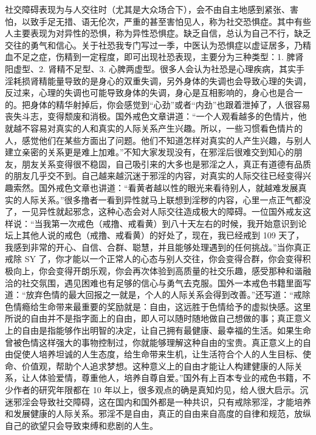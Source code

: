 社交障碍表现为与人交往时（尤其是大众场合下），会不由自主地感到紧张、害怕，以致手足无措、语无伦次，严重的甚至害怕见人，称为社交恐惧症。其中有些人主要表现为对异性的恐惧，称为异性恐惧症。缺乏自信，总认为自己不行，缺乏交往的勇气和信心。关于社恐我专门写过一季，中医认为恐惧症以虚证居多，乃精血不足之症，伤精到一定程度，即可出现社恐表现，主要分为三种类型：1. 脾肾阳虚型、2. 肾精不足型、3. 心脾两虚型。很多人会认为社恐是心理疾病，其实手淫耗损肾精能量导致的是身心的双重失调，另外身体的失调也会导致心理的失调，反过来，心理的失调也可能导致身体的失调，身心是互相影响的，身心也是合一的。把身体的精华射掉后，你会感觉到“心劲”或者“内劲”也跟着泄掉了，人很容易丧失斗志，变得颓废和消极。国外戒色文章讲道：“一个人观看越多的色情片，他就越不容易对真实的人和真实的人际关系产生兴趣。所以，一些习惯看色情片的人，感觉他们在某些方面出了问题。他们不知道怎样对真实的人产生兴趣，与别人建立亲密的关系更是难上加难。”不知大家发现没有，在邪淫后很难交到知心的朋友，朋友关系变得很不稳固，自己吸引来的大多也是邪淫之人，真正有道德有品质的朋友几乎交不到。自己越来越沉迷于邪淫的内容，对真实的人际交往已经变得兴趣索然。国外戒色文章也讲道：“看黄者越以性的眼光来看待别人，就越难发展真实的人际关系。”很多撸者一看到异性就马上联想到淫秽的内容，心里一点正气都没了，一见异性就起邪念，这种心态会对人际交往造成极大的障碍。一位国外戒友这样说：“当我第一次戒色（戒撸、戒看黄）到八十天左右的时候，我开始意识到论坛上其他人说的戒色（戒撸、戒看黄）的好处了，现在，我已经戒到 109 天了，我感到非常的开心、自信、合群、聪慧，并且能够处理遇到的任何挑战。”当你真正戒除 SY 了，你才能以一个正常人的心态与别人交往，你会变得合群，你会变得积极向上，你会变得开朗乐观，你会再次体验到高质量的社交乐趣，感受那种和谐融洽的社交氛围，遇见困难也有足够的信心与勇气去克服。国外一本戒色书籍里面写道：“放弃色情的最大回报之一就是，个人的人际关系会得到改善。”还写道：“戒除色情瘾给生命带来最重要的奖励就是：自由，这远胜于色情给予的虚拟快感。这里所说的自由并不是指字面上的自由，即人可以随时随地做自己想做的事；真正意义上的自由是指能够作出明智的决定，让自己拥有最健康、最幸福的生活。如果生命曾被色情这样强大的事物控制过，你就能够理解这种自由的宝贵。真正意义上的自由促使人培养坦诚的人生态度，给生命带来生机，让生活符合个人的人生目标、使命、价值观，帮助个人追求梦想。这种意义上的自由才能让人构建健康的人际关系，让人体验爱情，尊重他人，培养自尊自爱。”国外有上百本专业的戒色书籍，不少作者的研究年限都在 10 年以上，很多观点的确是真知灼见，给人很大启示。沉迷邪淫会导致社交障碍，这在国内和国外都是一种共识，只有戒除邪淫，才能培养和发展健康的人际关系。邪淫不是自由，真正的自由来自高度的自律和规范，放纵自己的欲望只会导致束缚和悲剧的人生。

